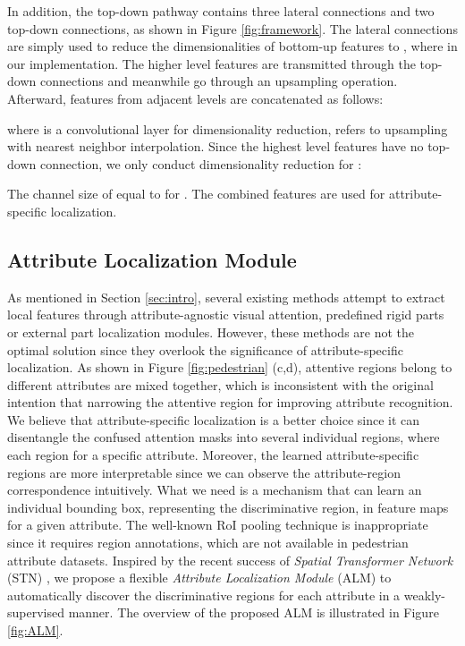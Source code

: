 \documentclass[10pt,twocolumn,letterpaper]{article}
\begin{document}
In addition, the top-down pathway contains three lateral connections and two top-down connections, as shown in Figure \ref{fig:framework}.
The lateral connections are simply used to reduce the dimensionalities of bottom-up features to , where  in our implementation.
The higher level features are transmitted through the top-down connections and meanwhile go through an upsampling operation.
Afterward, features from adjacent levels are concatenated as follows:

where  is a  convolutional layer for dimensionality reduction,  refers to upsampling with nearest neighbor interpolation.
Since the highest level features have no top-down connection, we only conduct dimensionality reduction for :

The channel size of  equal to  for .
The combined features  are used for attribute-specific localization.

\subsection{Attribute Localization Module} \label{sec:ALM}
As mentioned in Section \ref{sec:intro}, several existing methods attempt to extract local features through attribute-agnostic visual attention, predefined rigid parts or external part localization modules.
However, these methods are not the optimal solution since they overlook the significance of attribute-specific localization.
As shown in Figure \ref{fig:pedestrian} (c,d), attentive regions belong to different attributes are mixed together, which is inconsistent with the original intention that narrowing the attentive region for improving attribute recognition.
We believe that attribute-specific localization is a better choice since it can disentangle the confused attention masks into several individual regions, where each region for a specific attribute.
Moreover, the learned attribute-specific regions are more interpretable since we can observe the attribute-region correspondence intuitively.
What we need is a mechanism that can learn an individual bounding box, representing the discriminative region, in feature maps for a given attribute.
The well-known RoI pooling technique \cite{girshick2015fast} is inappropriate since it requires region annotations, which are not available in pedestrian attribute datasets.
Inspired by the recent success of \textit{Spatial Transformer Network} (STN) \cite{stn}, we propose a flexible \textit{Attribute Localization Module} (ALM) to automatically discover the discriminative regions for each attribute in a weakly-supervised manner.
The overview of the proposed ALM is illustrated in Figure \ref{fig:ALM}.
\end{document}
